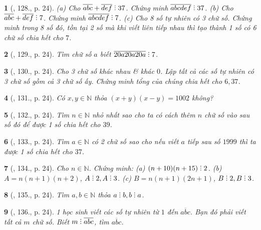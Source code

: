 \documentclass{article}
\newtheorem{baitoan}{}
\DeclareRobustCommand{\divby}{%
	\mathrel{\vbox{\baselineskip.65ex\lineskiplimit0pt\hbox{.}\hbox{.}\hbox{.}}}%
}
\begin{document}
\begin{baitoan}[\cite{Binh_Toan_6_tap_1}, 128., p. 24]
	(a) Cho $\overline{abc} + \overline{def}\divby37$. Chứng minh $\overline{abcdef}\divby37$. (b) Cho $\overline{abc} + \overline{def}\divby7$. Chứng minh $\overline{abcdef}\divby7$. (c) Cho 8 số tự nhiên có 3 chữ số. Chứng minh trong 8 số đó, tồn tại 2 số mà khi viết liên tiếp nhau thì tạo thành 1 số có 6 chữ số chia hết cho $7$.
\end{baitoan}

\begin{baitoan}[\cite{Binh_Toan_6_tap_1}, 129., p. 24]
	Tìm chữ số $a$ biết $\overline{20a20a20a}\divby7$.
\end{baitoan}

\begin{baitoan}[\cite{Binh_Toan_6_tap_1}, 130., p. 24]
	Cho 3 chữ số khác nhau \& khác $0$. Lập tất cả các số tự nhiên có 3 chữ số gồm cả 3 chữ số ấy. Chứng minh tổng của chúng chia hết cho $6,37$.
\end{baitoan}

\begin{baitoan}[\cite{Binh_Toan_6_tap_1}, 131., p. 24]
	Có $x,y\in\mathbb{N}$ thỏa $(x + y)(x - y) = 1002$ không?
\end{baitoan}

\begin{baitoan}[\cite{Binh_Toan_6_tap_1}, 132., p. 24]
	Tìm $n\in\mathbb{N}$ nhỏ nhất sao cho ta có cách thêm $n$ chữ số vào sau số đó để được 1 số chia hết cho $39$.
\end{baitoan}

\begin{baitoan}[\cite{Binh_Toan_6_tap_1}, 133., p. 24]
	Tìm $a\in\mathbb{N}$ có 2 chữ số sao cho nếu viết $a$ tiếp sau số $1999$ thì ta được 1 số chia hết cho $37$.
\end{baitoan}

\begin{baitoan}[\cite{Binh_Toan_6_tap_1}, 134., p. 24]
	Cho $n\in\mathbb{N}$. Chứng minh: (a) $(n + 10)(n + 15)\divby2$. (b) $A = n(n + 1)(n + 2)$, $A\divby2,A\divby3$. (c) $B = n(n + 1)(2n + 1)$, $B\divby2,B\divby3$.
\end{baitoan}

\begin{baitoan}[\cite{Binh_Toan_6_tap_1}, 135., p. 24]
	Tìm $a,b\in\mathbb{N}$ thỏa $a\divby b,b\divby a$.
\end{baitoan}

\begin{baitoan}[\cite{Binh_Toan_6_tap_1}, 136., p. 24]
	1 học sinh viết các số tự nhiên từ $1$ đến $\overline{abc}$. Bạn đó phải viết tất cả $m$ chữ số. Biết $m\divby\overline{abc}$, tìm $\overline{abc}$.
\end{baitoan}
\end{document}
